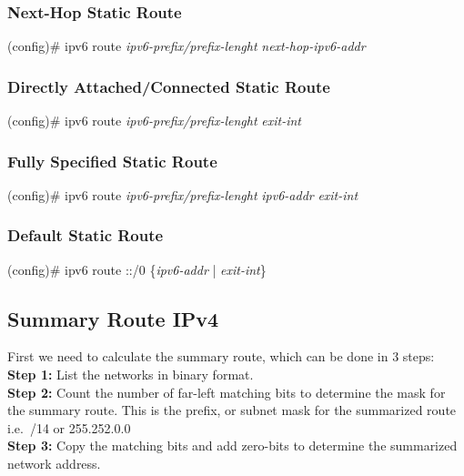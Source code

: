 \subsubsection*{Next-Hop Static Route}
(config)\# ipv6 route \textit{ipv6-prefix/prefix-lenght} \textit{next-hop-ipv6-addr}
\subsubsection*{Directly Attached/Connected Static Route}
(config)\# ipv6 route \textit{ipv6-prefix/prefix-lenght} \textit{exit-int}
\subsubsection*{Fully Specified Static Route}
(config)\# ipv6 route \textit{ipv6-prefix/prefix-lenght} \textit{ipv6-addr} \textit{exit-int}
\subsubsection*{Default Static Route}
(config)\# ipv6 route ::/0 \{\textit{ipv6-addr} | \textit{exit-int}\}

\subsection{Summary Route IPv4}
\textrm{First we need to calculate the summary route, which can be done in 3 steps:\\
\textbf{Step 1:} List the networks in binary format.\\
\textbf{Step 2:} Count the number of far-left matching bits to determine the mask for the summary route. This is the prefix, or subnet mask for the summarized route i.e.\ /14 or 255.252.0.0\\
\textbf{Step 3:} Copy the matching bits and add zero-bits to determine the summarized network address.
}

